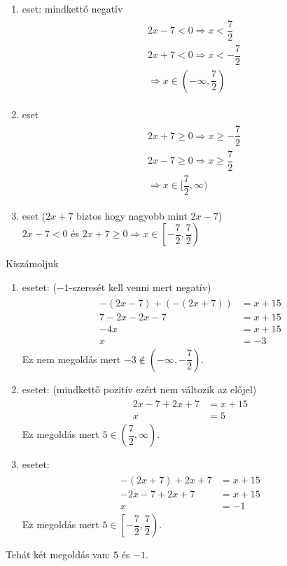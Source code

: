 \documentclass[12pt,a4paper,fleqn]{article}
\begin{document}
\begin{enumerate}
  \item eset: mindkettő negatív
  \begin{align*}
    \begin{split}
      &2x - 7 < 0 \Rightarrow x < \dfrac{7}{2} \\
      &2x + 7 < 0 \Rightarrow x < -\dfrac{7}{2} \\
      &\Longrightarrow x \in (-\infty, \dfrac{7}{2})
    \end{split}
  \end{align*}
  \item eset
  \begin{align*}
    \begin{split}
      &2x + 7 \geq 0 \Rightarrow x \geq -\dfrac{7}{2} \\
      &2x - 7 \geq 0 \Rightarrow x \geq \dfrac{7}{2} \\
      &\Longrightarrow x \in [\dfrac{7}{2}, \infty)
    \end{split}
  \end{align*}
  \item eset ($2x+7$ biztos hogy nagyobb mint $2x-7$) \\
  $2x-7<0$ és $2x+7 \geq 0 \Rightarrow x \in \left[ -\dfrac{7}{2}, \dfrac{7}{2} \right)$
\end{enumerate}
Kiszámoljuk
\begin{enumerate}
  \item esetet: ($-1$-szeresét kell venni mert negatív) \\
  \begin{align*}
    \begin{split}
      -(2x-7)+(-(2x+7)) &= x + 15 \\
      7-2x-2x-7&=x+15 \\
      -4x&=x+15 \\
      x &=-3
    \end{split}
  \end{align*}
  Ez nem megoldás mert $-3 \notin (-\infty, -\dfrac{7}{2})$.
  \item esetet: (mindkettő pozitív ezért nem változik az előjel)
  \begin{align*}
    \begin{split}
      2x-7+2x+7 &= x + 15 \\
      x &= 5
    \end{split}
  \end{align*}
  Ez megoldás mert $5 \in (\dfrac{7}{2}, \infty)$.
  \item esetet:
  \begin{align*}
    \begin{split}
      -(2x+7)+2x+7 &= x + 15 \\
      -2x-7+2x+7 &= x + 15 \\
      x &= -1
    \end{split}
  \end{align*}
  Ez megoldás mert $5 \in \left[ -\dfrac{7}{2}, \dfrac{7}{2} \right)$.
\end{enumerate}
Tehát két megoldás van: $5$ és $-1$.
\end{document}
